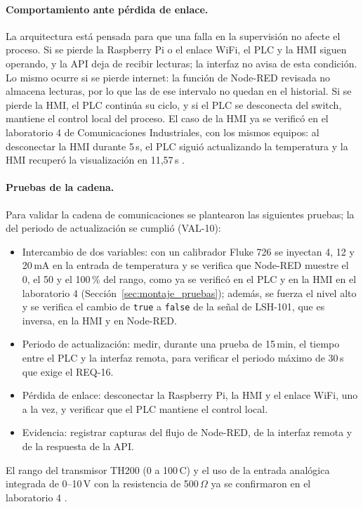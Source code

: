 \paragraph{Comportamiento ante pérdida de enlace.} La arquitectura está pensada para que una falla en la supervisión no afecte el proceso. Si se pierde la Raspberry Pi o el enlace WiFi, el PLC y la HMI siguen operando, y la API deja de recibir lecturas; la interfaz no avisa de esta condición. Lo mismo ocurre si se pierde internet: la función de Node-RED revisada no almacena lecturas, por lo que las de ese intervalo no quedan en el historial. Si se pierde la HMI, el PLC continúa su ciclo, y si el PLC se desconecta del switch, mantiene el control local del proceso. El caso de la HMI ya se verificó en el laboratorio 4 de Comunicaciones Industriales, con los mismos equipos: al desconectar la HMI durante 5\,s, el PLC siguió actualizando la temperatura y la HMI recuperó la visualización en 11,57\,s \cite{ruiz2026lab4}.

\paragraph{Pruebas de la cadena.} Para validar la cadena de comunicaciones se plantearon las siguientes pruebas; la del periodo de actualización se cumplió (VAL-10):
\begin{itemize}
\item Intercambio de dos variables: con un calibrador Fluke 726 se inyectan 4, 12 y 20\,mA en la entrada de temperatura y se verifica que Node-RED muestre el 0, el 50 y el 100\,\% del rango, como ya se verificó en el PLC y en la HMI en el laboratorio 4 (Sección~\ref{sec:montaje_pruebas}); además, se fuerza el nivel alto y se verifica el cambio de \texttt{true} a \texttt{false} de la señal de LSH-101, que es inversa, en la HMI y en Node-RED.
\item Periodo de actualización: medir, durante una prueba de 15\,min, el tiempo entre el PLC y la interfaz remota, para verificar el periodo máximo de 30\,s que exige el REQ-16.
\item Pérdida de enlace: desconectar la Raspberry Pi, la HMI y el enlace WiFi, uno a la vez, y verificar que el PLC mantiene el control local.
\item Evidencia: registrar capturas del flujo de Node-RED, de la interfaz remota y de la respuesta de la API.
\end{itemize}

El rango del transmisor TH200 (0 a 100\,\textdegree C) y el uso de la entrada analógica integrada de 0--10\,V con la resistencia de 500\,$\Omega$ ya se confirmaron en el laboratorio 4 \cite{ruiz2026lab4}.
